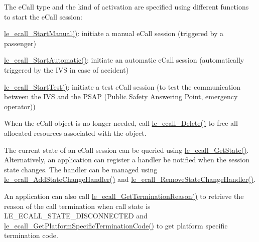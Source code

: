 The e\+Call type and the kind of activation are specified using different functions to start the e\+Call session\+:
\begin{DoxyItemize}
\item \hyperlink{le__ecall__interface_8h_ab106c3ca87fc8dd8239d2849df932122}{le\+\_\+ecall\+\_\+\+Start\+Manual()}\+: initiate a manual e\+Call session (triggered by a passenger)
\item \hyperlink{le__ecall__interface_8h_aa25256eeacefcf00c14763ef294c7667}{le\+\_\+ecall\+\_\+\+Start\+Automatic()}\+: initiate an automatic e\+Call session (automatically triggered by the I\+VS in case of accident)
\item \hyperlink{le__ecall__interface_8h_aa5d23a1bea370b1ae29fc52d7a89d947}{le\+\_\+ecall\+\_\+\+Start\+Test()}\+: initiate a test e\+Call session (to test the communication between the I\+VS and the P\+S\+AP (Public Safety Answering Point, emergency operator))
\end{DoxyItemize}

When the e\+Call object is no longer needed, call \hyperlink{le__ecall__interface_8h_af1221deb68c46912748f65505b3e4919}{le\+\_\+ecall\+\_\+\+Delete()} to free all allocated resources associated with the object.

The current state of an e\+Call session can be queried using \hyperlink{le__ecall__interface_8h_a7881e794b9249222edde10f76d7663c9}{le\+\_\+ecall\+\_\+\+Get\+State()}. Alternatively, an application can register a handler be notified when the session state changes. The handler can be managed using \hyperlink{le__ecall__interface_8h_a453b64579f2884f1d26981bca38a201c}{le\+\_\+ecall\+\_\+\+Add\+State\+Change\+Handler()} and \hyperlink{le__ecall__interface_8h_aa2eb6eb76611d78e27b71426b2160cb1}{le\+\_\+ecall\+\_\+\+Remove\+State\+Change\+Handler()}.

An application can also call \hyperlink{le__ecall__interface_8h_a771b2ef399a8fbf3b80c4eb11152c06a}{le\+\_\+ecall\+\_\+\+Get\+Termination\+Reason()} to retrieve the reason of the call termination when call state is L\+E\+\_\+\+E\+C\+A\+L\+L\+\_\+\+S\+T\+A\+T\+E\+\_\+\+D\+I\+S\+C\+O\+N\+N\+E\+C\+T\+ED and \hyperlink{le__ecall__interface_8h_a8ffb7fb207537ea4574823285ebb6ca1}{le\+\_\+ecall\+\_\+\+Get\+Platform\+Specific\+Termination\+Code()} to get platform specific termination code.


